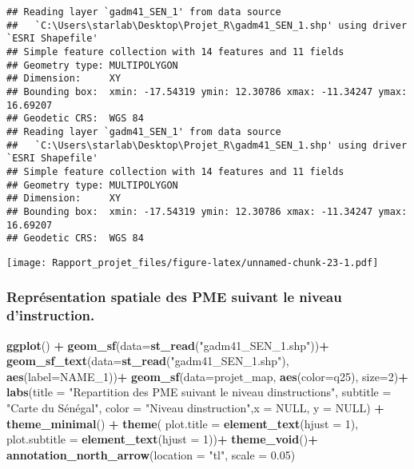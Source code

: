 \documentclass[
]{article}
\newenvironment{Shaded}{\begin{snugshade}}{\end{snugshade}}
\newcommand{\AttributeTok}[1]{\textcolor[rgb]{0.13,0.29,0.53}{#1}}
\newcommand{\ConstantTok}[1]{\textcolor[rgb]{0.56,0.35,0.01}{#1}}
\newcommand{\DecValTok}[1]{\textcolor[rgb]{0.00,0.00,0.81}{#1}}
\newcommand{\FloatTok}[1]{\textcolor[rgb]{0.00,0.00,0.81}{#1}}
\newcommand{\FunctionTok}[1]{\textcolor[rgb]{0.13,0.29,0.53}{\textbf{#1}}}
\newcommand{\NormalTok}[1]{#1}
\newcommand{\SpecialCharTok}[1]{\textcolor[rgb]{0.81,0.36,0.00}{\textbf{#1}}}
\newcommand{\StringTok}[1]{\textcolor[rgb]{0.31,0.60,0.02}{#1}}
\begin{document}
\begin{verbatim}
## Reading layer `gadm41_SEN_1' from data source 
##   `C:\Users\starlab\Desktop\Projet_R\gadm41_SEN_1.shp' using driver `ESRI Shapefile'
## Simple feature collection with 14 features and 11 fields
## Geometry type: MULTIPOLYGON
## Dimension:     XY
## Bounding box:  xmin: -17.54319 ymin: 12.30786 xmax: -11.34247 ymax: 16.69207
## Geodetic CRS:  WGS 84
## Reading layer `gadm41_SEN_1' from data source 
##   `C:\Users\starlab\Desktop\Projet_R\gadm41_SEN_1.shp' using driver `ESRI Shapefile'
## Simple feature collection with 14 features and 11 fields
## Geometry type: MULTIPOLYGON
## Dimension:     XY
## Bounding box:  xmin: -17.54319 ymin: 12.30786 xmax: -11.34247 ymax: 16.69207
## Geodetic CRS:  WGS 84
\end{verbatim}

\texttt{[image: Rapport\_projet\_files/figure-latex/unnamed-chunk-23-1.pdf]}

\hypertarget{repruxe9sentation-spatiale-des-pme-suivant-le-niveau-dinstruction.}{%
\subsubsection{Représentation spatiale des PME suivant le niveau
d'instruction.}\label{repruxe9sentation-spatiale-des-pme-suivant-le-niveau-dinstruction.}}

\begin{Shaded}
\begin{Highlighting}[]
\FunctionTok{ggplot}\NormalTok{() }\SpecialCharTok{+}
  \FunctionTok{geom\_sf}\NormalTok{(}\AttributeTok{data=}\FunctionTok{st\_read}\NormalTok{(}\StringTok{"gadm41\_SEN\_1.shp"}\NormalTok{))}\SpecialCharTok{+}
  \FunctionTok{geom\_sf\_text}\NormalTok{(}\AttributeTok{data=}\FunctionTok{st\_read}\NormalTok{(}\StringTok{"gadm41\_SEN\_1.shp"}\NormalTok{), }\FunctionTok{aes}\NormalTok{(}\AttributeTok{label=}\NormalTok{NAME\_1))}\SpecialCharTok{+}
  \FunctionTok{geom\_sf}\NormalTok{(}\AttributeTok{data=}\NormalTok{projet\_map, }\FunctionTok{aes}\NormalTok{(}\AttributeTok{color=}\NormalTok{q25), }\AttributeTok{size=}\DecValTok{2}\NormalTok{)}\SpecialCharTok{+}
  \FunctionTok{labs}\NormalTok{(}\AttributeTok{title =} \StringTok{"Repartition des PME suivant le niveau d\textquotesingle{}instructions"}\NormalTok{,}
       \AttributeTok{subtitle =} \StringTok{"Carte du Sénégal"}\NormalTok{,}
       \AttributeTok{color =} \StringTok{"Niveau d\textquotesingle{}instruction"}\NormalTok{,}\AttributeTok{x =} \ConstantTok{NULL}\NormalTok{, }\AttributeTok{y =} \ConstantTok{NULL}\NormalTok{) }\SpecialCharTok{+}
  \FunctionTok{theme\_minimal}\NormalTok{() }\SpecialCharTok{+}
  \FunctionTok{theme}\NormalTok{(}
    \AttributeTok{plot.title =} \FunctionTok{element\_text}\NormalTok{(}\AttributeTok{hjust =} \DecValTok{1}\NormalTok{),}
    \AttributeTok{plot.subtitle =} \FunctionTok{element\_text}\NormalTok{(}\AttributeTok{hjust =} \DecValTok{1}\NormalTok{))}\SpecialCharTok{+}
  \FunctionTok{theme\_void}\NormalTok{()}\SpecialCharTok{+}
  \FunctionTok{annotation\_north\_arrow}\NormalTok{(}\AttributeTok{location =} \StringTok{"tl"}\NormalTok{, }\AttributeTok{scale =} \FloatTok{0.05}\NormalTok{)}
\end{Highlighting}
\end{Shaded}
\end{document}
